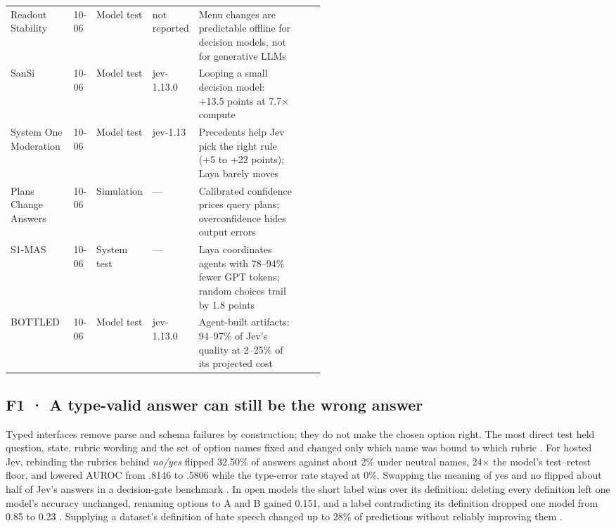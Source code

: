 {\begin{xltabular}{\linewidth}{p{0.2\linewidth}p{0.055\linewidth}p{0.085\linewidth}p{0.11\linewidth}Xp{0.075\linewidth}}
Readout Stability & 10-06 & Model test & not reported & Menu changes are predictable offline for decision models, not for generative LLMs & \citep{arxiv2610_07716} \\
SanSi & 10-06 & Model test & jev-1.13.0 & Looping a small decision model: +13.5 points at 7.7× compute & \citep{arxiv2610_07730} \\
System One Moderation & 10-06 & Model test & jev-1.13 & Precedents help Jev pick the right rule (+5 to +22 points); Laya barely moves & \citep{arxiv2610_07953} \\
Plans Change Answers & 10-06 & Simulation & — & Calibrated confidence prices query plans; overconfidence hides output errors & \citep{arxiv2610_08089} \\
S1-MAS & 10-06 & System test & — & Laya coordinates agents with 78–94\% fewer GPT tokens; random choices trail by 1.8 points & \citep{arxiv2610_08155} \\
BOTTLED & 10-06 & Model test & jev-1.13.0 & Agent-built artifacts: 94–97\% of Jev’s quality at 2–25\% of its projected cost & \citep{arxiv2610_08775} \\
\bottomrule
\end{xltabular}}

\subsection{F1 · A type-valid answer can still be the wrong answer}

Typed interfaces remove parse and schema failures by construction; they do not make the chosen option right. The most direct test held question, state, rubric wording and the set of option names fixed and changed only which name was bound to which rubric \citep{arxiv2609_26758}. For hosted Jev, rebinding the rubrics behind \emph{no/yes} flipped 32.50\% of answers against about 2\% under neutral names, 24× the model's test–retest floor, and lowered AUROC from .8146 to .5806 while the type-error rate stayed at 0\%. Swapping the meaning of yes and no flipped about half of Jev's answers in a decision-gate benchmark \citep{arxiv2610_00346}. In open models the short label wins over its definition: deleting every definition left one model's accuracy unchanged, renaming options to A and B gained 0.151, and a label contradicting its definition dropped one model from 0.85 to 0.23 \citep{arxiv2610_02586}. Supplying a dataset's definition of hate speech changed up to 28\% of predictions without reliably improving them \citep{arxiv2610_03324}.

